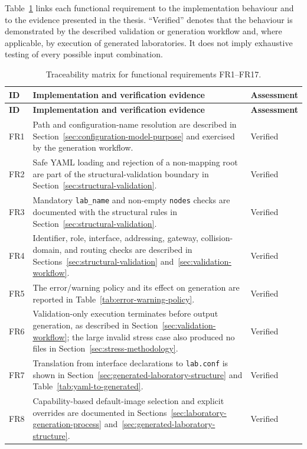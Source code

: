 Table~\ref{tab:functional-requirements-traceability} links each functional
requirement to the implementation behaviour and to the evidence presented in
the thesis. ``Verified'' denotes that the behaviour is demonstrated by the
described validation or generation workflow and, where applicable, by
execution of generated laboratories. It does not imply exhaustive testing of
every possible input combination.

\begin{longtable}{p{}p{}p{}}
\caption{Traceability matrix for functional requirements FR1--FR17.}
\label{tab:functional-requirements-traceability}\\
\toprule
\textbf{ID} & \textbf{Implementation and verification evidence} & \textbf{Assessment} \\
\midrule
\endfirsthead
\toprule
\textbf{ID} & \textbf{Implementation and verification evidence} & \textbf{Assessment} \\
\midrule
\endhead
FR1 & Path and configuration-name resolution are described in Section~\ref{sec:configuration-model-purpose} and exercised by the generation workflow. & Verified \\
FR2 & Safe YAML loading and rejection of a non-mapping root are part of the structural-validation boundary in Section~\ref{sec:structural-validation}. & Verified \\
FR3 & Mandatory \texttt{lab\_name} and non-empty \texttt{nodes} checks are documented with the structural rules in Section~\ref{sec:structural-validation}. & Verified \\
FR4 & Identifier, role, interface, addressing, gateway, collision-domain, and routing checks are described in Sections~\ref{sec:structural-validation} and~\ref{sec:validation-workflow}. & Verified \\
FR5 & The error/warning policy and its effect on generation are reported in Table~\ref{tab:error-warning-policy}. & Verified \\
FR6 & Validation-only execution terminates before output generation, as described in Section~\ref{sec:validation-workflow}; the large invalid stress case also produced no files in Section~\ref{sec:stress-methodology}. & Verified \\
FR7 & Translation from interface declarations to \texttt{lab.conf} is shown in Section~\ref{sec:generated-laboratory-structure} and Table~\ref{tab:yaml-to-generated}. & Verified \\
FR8 & Capability-based default-image selection and explicit overrides are documented in Sections~\ref{sec:laboratory-generation-process} and~\ref{sec:generated-laboratory-structure}. & Verified \\

\end{longtable}
